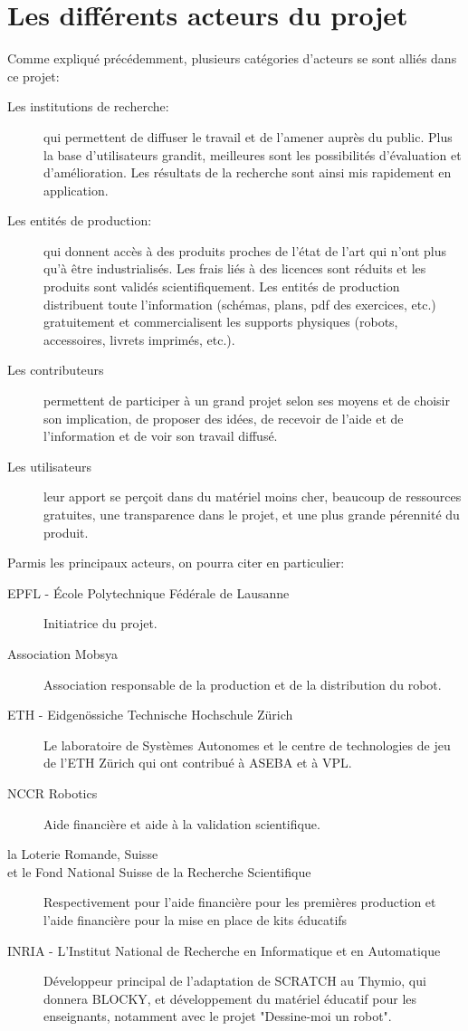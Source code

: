 \documentclass[a4paper, 12pt]{report}
\begin{document}
\section{Les différents acteurs du projet}
Comme expliqué précédemment, plusieurs catégories d'acteurs se sont alliés dans ce projet:
\begin{description}
\item[Les institutions de recherche: ]qui permettent de diffuser le travail et de l'amener auprès du public. Plus la base d'utilisateurs grandit, meilleures sont les possibilités d'évaluation et d'amélioration. Les résultats de la recherche sont ainsi mis rapidement en application.
\item[Les entités de production: ] qui donnent accès à des produits proches de l'état de l'art qui n'ont plus qu'à être industrialisés. Les frais liés à des licences sont réduits et les produits sont validés scientifiquement. Les entités de production distribuent toute l'information (schémas, plans, pdf des exercices, etc.) gratuitement et commercialisent les supports physiques (robots, accessoires, livrets imprimés, etc.).
\item[Les contributeurs] permettent de participer à un grand projet selon ses moyens et de choisir son implication, de proposer des idées, de recevoir de l'aide et de l'information et de voir son travail diffusé.
\item[Les utilisateurs] leur apport se perçoit dans du matériel moins cher, beaucoup de ressources gratuites, une transparence dans le projet, et une plus grande pérennité du produit.
\end{description}

Parmis les principaux acteurs, on pourra citer en particulier:
\begin{description}
\item[EPFL - École Polytechnique Fédérale de Lausanne] Initiatrice du projet.
\item[Association Mobsya] Association responsable de la production et de la distribution du robot.
\item[ETH - Eidgenössiche Technische Hochschule Zürich] Le laboratoire de Systèmes Autonomes et le centre de technologies de jeu de l'ETH Zürich qui ont contribué à ASEBA et à VPL.
\item[NCCR Robotics] Aide financière et aide à la validation scientifique.
\item[la Loterie Romande, Suisse]
\item[et le Fond National Suisse de la Recherche Scientifique] Respectivement pour l'aide financière pour les premières production et l'aide financière pour la mise en place de kits éducatifs
\item[INRIA - L'Institut National de Recherche en Informatique et en Automatique] Développeur principal de l'adaptation de SCRATCH au Thymio, qui donnera BLOCKY, et développement du matériel éducatif pour les enseignants, notamment avec le projet "Dessine-moi un robot". 
\end{description} 
\end{document}
